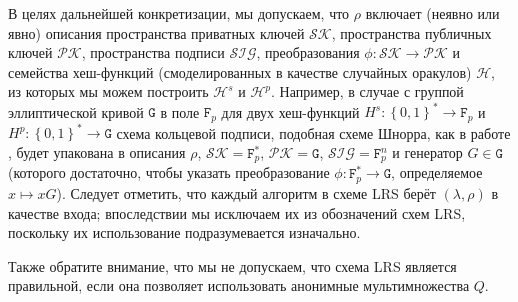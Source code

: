 \documentclass{llncs}
\newcommand{\F}{\texttt{F}_p}
\newcommand{\G}{\texttt{G}}
\newcommand{\Hp}{\mathcal{H}^p}
\newcommand{\Hs}{\mathcal{H}^s}
\begin{document}
В целях дальнейшей конкретизации, мы допускаем, что $\rho$ включает (неявно или явно) описания пространства приватных ключей $\mathcal{SK}$, пространства публичных ключей $\mathcal{PK}$, пространства подписи $\mathcal{SIG}$, преобразования $\phi: \mathcal{SK} \to \mathcal{PK}$ и семейства хеш-функций (смоделированных в качестве случайных оракулов) $\mathcal{H}$, из которых мы можем построить $\Hs$ и $\Hp$. Например, в случае с группой эллиптической кривой $\G$ в поле $\F$ для двух хеш-функций $H^s:\left\{0,1\right\}^* \to \F$ и $H^p:\left\{0,1\right\}^* \to \G$ схема кольцевой подписи, подобная схеме Шнорра, как в работе \cite{liu2004linkable}, будет упакована в описания $\rho$, $\mathcal{SK} = \F^*$, $\mathcal{PK} = \G$, $\mathcal{SIG} = \F^n$ и генератор $G \in \G$ (которого достаточно, чтобы указать преобразование $\phi: \F^* \to \G$, определяемое $x \mapsto xG$). Следует отметить, что каждый алгоритм в схеме LRS берёт $(\lambda, \rho)$ в качестве входа; впоследствии мы  исключаем их из обозначений схем LRS, поскольку их использование подразумевается изначально.

Также обратите внимание, что мы не допускаем, что схема LRS является правильной, если она позволяет использовать анонимные мультимножества $Q$.
\end{document}
